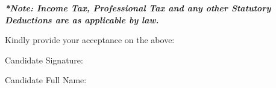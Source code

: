 \documentclass[11pt,a4paper]{article}
\begin{document}
\vspace{0.3cm}

\textit{\textbf{*Note: Income Tax, Professional Tax and any other Statutory Deductions are as applicable by law.}}

\vspace{0.4cm}

Kindly provide your acceptance on the above:

\vspace{0.4cm}

Candidate Signature: 

\vspace{0.3cm}

Candidate Full Name:   
\end{document}
